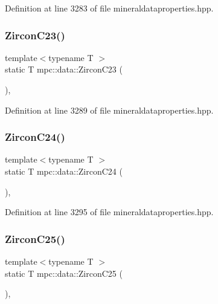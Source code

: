 Definition at line 3283 of file mineraldataproperties.\+hpp.

\mbox{\label{namespacempc_1_1data_a564edd28f8ffeb09b13308cc4ca2bfd2}} 
\subsubsection{\texorpdfstring{Zircon\+C23()}{ZirconC23()}}
{\footnotesize\ttfamily template$<$typename T $>$ \\
static T mpc\+::data\+::\+Zircon\+C23 (\begin{DoxyParamCaption}{ }\end{DoxyParamCaption})\hspace{0.3cm}{\ttfamily [inline]}, {\ttfamily [static]}}



Definition at line 3289 of file mineraldataproperties.\+hpp.

\mbox{\label{namespacempc_1_1data_a92f6706c527b046775b3092a1b56b71a}} 
\subsubsection{\texorpdfstring{Zircon\+C24()}{ZirconC24()}}
{\footnotesize\ttfamily template$<$typename T $>$ \\
static T mpc\+::data\+::\+Zircon\+C24 (\begin{DoxyParamCaption}{ }\end{DoxyParamCaption})\hspace{0.3cm}{\ttfamily [inline]}, {\ttfamily [static]}}



Definition at line 3295 of file mineraldataproperties.\+hpp.

\mbox{\label{namespacempc_1_1data_a146401f3325117c83e1a826dce7468b4}} 
\subsubsection{\texorpdfstring{Zircon\+C25()}{ZirconC25()}}
{\footnotesize\ttfamily template$<$typename T $>$ \\
static T mpc\+::data\+::\+Zircon\+C25 (\begin{DoxyParamCaption}{ }\end{DoxyParamCaption})\hspace{0.3cm}{\ttfamily [inline]}, {\ttfamily [static]}}



